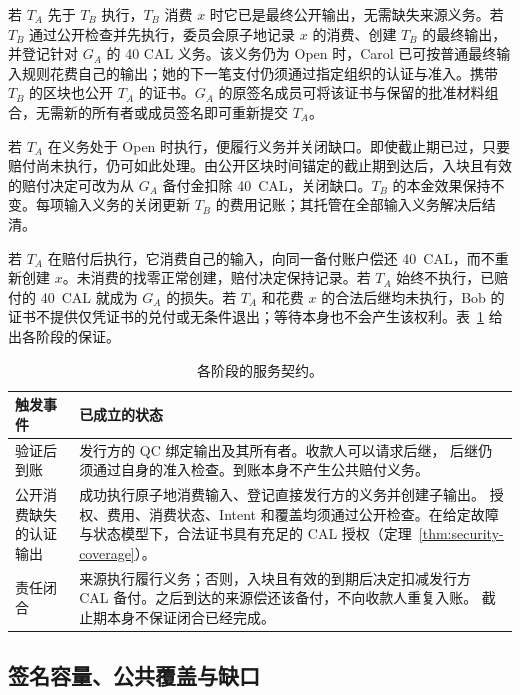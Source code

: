 若 $T_A$ 先于 $T_B$ 执行，$T_B$ 消费 $x$ 时它已是最终公开输出，无需缺失来源义务。若 $T_B$ 通过公开检查并先执行，委员会原子地记录 $x$ 的消费、创建 $T_B$ 的最终输出，并登记针对 $G_A$ 的 40 CAL 义务。该义务仍为 Open 时，Carol 已可按普通最终输入规则花费自己的输出；她的下一笔支付仍须通过指定组织的认证与准入。携带 $T_B$ 的区块也公开 $T_A$ 的证书。$G_A$ 的原签名成员可将该证书与保留的批准材料组合，无需新的所有者或成员签名即可重新提交 $T_A$。

若 $T_A$ 在义务处于 Open 时执行，便履行义务并关闭缺口。即使截止期已过，只要赔付尚未执行，仍可如此处理。由公开区块时间锚定的截止期到达后，入块且有效的赔付决定可改为从 $G_A$ 备付金扣除 40~CAL，关闭缺口。$T_B$ 的本金效果保持不变。每项输入义务的关闭更新 $T_B$ 的费用记账；其托管在全部输入义务解决后结清。

若 $T_A$ 在赔付后执行，它消费自己的输入，向同一备付账户偿还 40~CAL，而不重新创建 $x$。未消费的找零正常创建，赔付决定保持记录。若 $T_A$ 始终不执行，已赔付的 40~CAL 就成为 $G_A$ 的损失。若 $T_A$ 和花费 $x$ 的合法后继均未执行，Bob 的证书不提供仅凭证书的兑付或无条件退出；等待本身也不会产生该权利。表~\ref{tab:model-contract} 给出各阶段的保证。

\begin{table}[!t]
\caption{各阶段的服务契约。}
\label{tab:model-contract}
\centering\small
\begin{tabular}{@{}>{\raggedright\arraybackslash}p{}>{\raggedright\arraybackslash}p{}@{}}
\toprule
触发事件 & 已成立的状态 \\
\midrule
验证后到账 &
发行方的 QC 绑定输出及其所有者。收款人可以请求后继，
后继仍须通过自身的准入检查。到账本身不产生公共赔付义务。 \\
公开消费缺失的认证输出 &
成功执行原子地消费输入、登记直接发行方的义务并创建子输出。
授权、费用、消费状态、Intent 和覆盖均须通过公开检查。在给定故障与状态模型下，合法证书具有充足的 CAL 授权（定理~\ref{thm:security-coverage}）。 \\
责任闭合 &
来源执行履行义务；否则，入块且有效的到期后决定扣减发行方
CAL 备付。之后到达的来源偿还该备付，不向收款人重复入账。
截止期本身不保证闭合已经完成。 \\
\bottomrule
\end{tabular}
\end{table}

\subsection{签名容量、公共覆盖与缺口}
\label{sec:model-layers}

